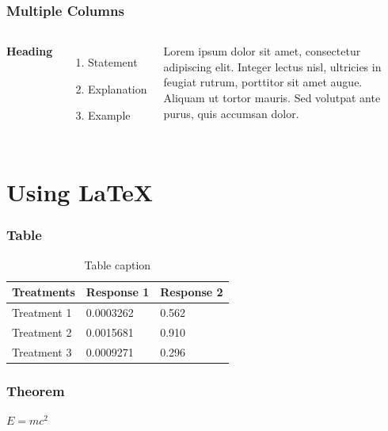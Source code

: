 \documentclass{beamer}
\begin{document}

\begin{frame}
\frametitle{Multiple Columns}
\begin{columns}[c] %

\textbf{Heading}
\begin{enumerate}
\item Statement
\item Explanation
\item Example
\end{enumerate}

Lorem ipsum dolor sit amet, consectetur adipiscing elit. Integer lectus nisl, ultricies in feugiat rutrum, porttitor sit amet augue. Aliquam ut tortor mauris. Sed volutpat ante purus, quis accumsan dolor.

\end{columns}
\end{frame}

\section{Using LaTeX}

\begin{frame}
\frametitle{Table}
\begin{table}
\begin{tabular}{l l l}
\toprule
\textbf{Treatments} & \textbf{Response 1} & \textbf{Response 2}\\
\midrule
Treatment 1 & 0.0003262 & 0.562 \\
Treatment 2 & 0.0015681 & 0.910 \\
Treatment 3 & 0.0009271 & 0.296 \\
\bottomrule
\end{tabular}
\caption{Table caption}
\end{table}
\end{frame}


\begin{frame}
\frametitle{Theorem}
\begin{theorem}
$E = mc^2$
\end{theorem}
\end{frame}
\end{document}
